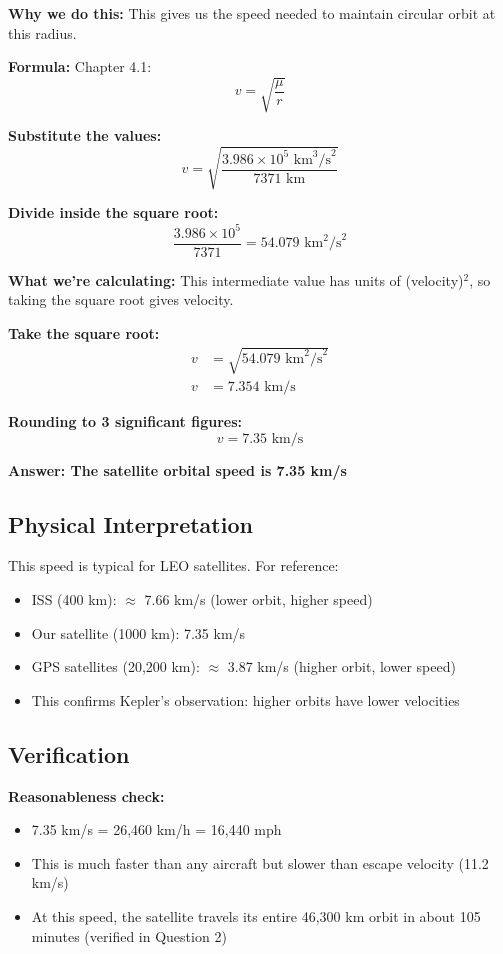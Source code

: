 \documentclass[11pt,letterpaper]{article}
\begin{document}
\textbf{Why we do this:} This gives us the speed needed to maintain circular orbit at this radius.

\textbf{Formula:} Chapter 4.1:
\begin{equation}
v = \sqrt{\frac{\mu}{r}}
\end{equation}

\textbf{Substitute the values:}
\begin{equation}
v = \sqrt{\frac{3.986 \times 10^5 \text{ km}^3\text{/s}^2}{7371 \text{ km}}}
\end{equation}

\textbf{Divide inside the square root:}
\begin{equation}
\frac{3.986 \times 10^5}{7371} = 54.079 \text{ km}^2\text{/s}^2
\end{equation}

\textbf{What we're calculating:} This intermediate value has units of (velocity)$^2$, so taking the square root gives velocity.

\textbf{Take the square root:}
\begin{align}
v &= \sqrt{54.079 \text{ km}^2\text{/s}^2} \\
v &= 7.354 \text{ km/s}
\end{align}

\textbf{Rounding to 3 significant figures:}
\begin{equation}
v = 7.35 \text{ km/s}
\end{equation}

\vspace{0.3cm}

\textbf{Answer: The satellite orbital speed is 7.35 km/s}

\subsection{Physical Interpretation}
This speed is typical for LEO satellites. For reference:
\begin{itemize}
    \item ISS (400 km): $\approx$ 7.66 km/s (lower orbit, higher speed)
    \item Our satellite (1000 km): 7.35 km/s
    \item GPS satellites (20,200 km): $\approx$ 3.87 km/s (higher orbit, lower speed)
    \item This confirms Kepler's observation: higher orbits have lower velocities
\end{itemize}

\subsection{Verification}
\textbf{Reasonableness check:}
\begin{itemize}
    \item 7.35 km/s = 26,460 km/h = 16,440 mph
    \item This is much faster than any aircraft but slower than escape velocity (11.2 km/s)
    \item At this speed, the satellite travels its entire 46,300 km orbit in about 105 minutes (verified in Question 2)
\end{itemize}
\end{document}
